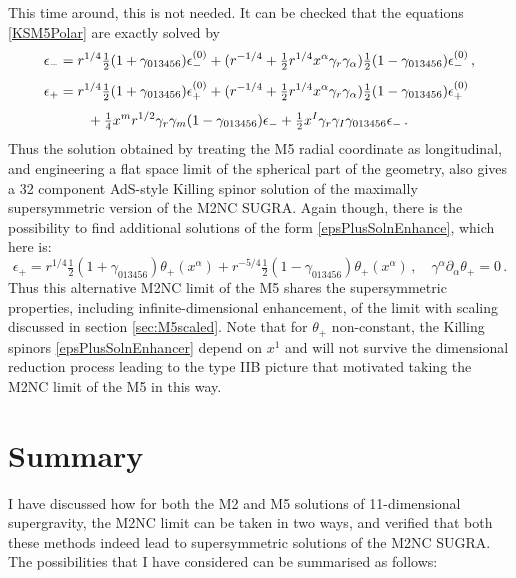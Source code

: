 \documentclass[11pt]{article}
\newcommand{\be}{\begin{equation}}
\newcommand{\ee}{\end{equation}}
\numberwithin{equation}{section}
\begin{document}
{{This time around, this is not needed.
It can be checked that the equations \eqref{KSM5Polar} are exactly solved by 
\begin{align}
\epsilon_-& = r^{1/4} \tfrac12 ( 1 +  \gamma_{013456}) \epsilon^{(0)}_-
+ ( r^{-1/4} + \tfrac12 r^{1/4} x^\alpha \gamma_r \gamma_\alpha )  \tfrac12 ( 1 - \gamma_{013456}) \epsilon^{(0)}_-\,,\\[4pt]
\notag
\epsilon_+& = r^{1/4} \tfrac12 ( 1 +  \gamma_{013456}) \epsilon^{(0)}_+
+ ( r^{-1/4} + \tfrac12 r^{1/4} x^\alpha \gamma_r \gamma_\alpha )  \tfrac12 ( 1 - \gamma_{013456}) \epsilon^{(0)}_+
\\[4pt] & \qquad + \tfrac14 x^m r^{1/2} \gamma_r \gamma_m ( 1 - \gamma_{013456})  \epsilon_- 
+ \tfrac12 x^I \gamma_r \gamma_I \gamma_{013456} \epsilon_- \,.
\end{align} 
Thus the solution obtained by treating the M5 radial coordinate as longitudinal, and engineering a flat space limit of the spherical part of the geometry, also gives a 32 component AdS-style Killing spinor solution of the maximally supersymmetric version of the M2NC SUGRA.
Again though, there is the possibility to find additional solutions of the form \eqref{epsPlusSolnEnhance}, which here is:
\be
\epsilon_+ = r^{1/4} \tfrac12 ( 1 + \gamma_{013456} ) \theta_+ (x^\alpha) + r^{-5/4} \tfrac12 ( 1 - \gamma_{013456} ) \theta_+ (x^\alpha) \,,\quad
\gamma^\alpha \partial_\alpha  \theta_+ = 0 \,.
\label{epsPlusSolnEnhancer}
\ee
Thus this alternative M2NC limit of the M5 shares the supersymmetric properties, including infinite-dimensional enhancement, of the limit with scaling discussed in section \ref{sec:M5scaled}.
Note that for $\theta_+$ non-constant, the Killing spinors \eqref{epsPlusSolnEnhancer} depend on $x^1$ and will not survive the dimensional reduction process leading to the type IIB picture that motivated taking the M2NC limit of the M5 in this way.

\section{Summary} 
\label{sec:summary}

I have discussed how for both the M2 and M5 solutions of 11-dimensional supergravity, the M2NC limit can be taken in two ways, and verified that both these methods indeed lead to supersymmetric solutions of the M2NC SUGRA.
The possibilities that I have considered can be summarised as follows: 

}}
\end{document}
